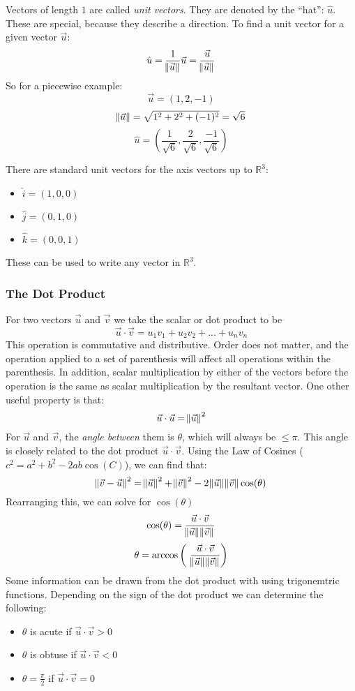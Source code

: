 \documentclass[12pt]{report}
\newcommand{\R}{\mathbb{R}}
\begin{document}
\begin{flushleft}
Vectors of length \(1\) are called \textit{unit vectors}. They are denoted by
the ``hat'': \(\hat{u}\). These are special, because they describe a direction.
To find a unit vector for a given vector \(\vec{u}\):
\[\hat{u} = \frac{1}{\norm{\vec{u}}}\vec{u} = \frac{\vec{u}}{\norm{\vec{u}}}\]
So for a piecewise example:
\[\vec{u} = (1, 2, -1)\]
\[\norm{\vec{u}} = \sqrt{1^2 + 2^2 + (-1)^2} = \sqrt{6}\]
\[\hat{u} = (\frac{1}{\sqrt{6}}, \frac{2}{\sqrt{6}}, \frac{-1}{\sqrt{6}})\]

\bigskip
There are standard unit vectors for the axis vectors up to \(\R^3\):
\begin{itemize}
    \item \(\hat{i} = (1, 0, 0)\)
    \item \(\hat{j} = (0, 1, 0)\)
    \item \(\hat{k} = (0, 0, 1)\)
\end{itemize}
These can be used to write any vector in \(\R^3\).

\subsubsection*{The Dot Product}
For two vectors \(\vec{u}\) and \(\vec{v}\) we take the scalar or dot product 
to be
\[\vec{u}\cdot\vec{v} = u_1v_1 + u_2v_2 + ... + u_nv_n\]
This operation is commutative and distributive. Order does not matter, and the
operation applied to a set of parenthesis will affect all operations within the
parenthesis. In addition, scalar multiplication by either of the vectors before 
the operation is the same as scalar multiplication by the resultant vector. 
One other useful property is that:
\[\vec{u}\cdot\vec{u} = \norm{\vec{u}}^2\]
For \(\vec{u}\) and \(\vec{v}\), the \textit{angle between} them is \(\theta\),
which will always be \(\leq\pi\). This angle is closely related to the dot 
product \(\vec{u}\cdot\vec{v}\). Using the Law of Cosines 
(\(c^2 = a^2 + b^2 - 2ab\cos(C)\)), we can find that:
\[\norm{\vec{v} - \vec{u}}^2 = \norm{\vec{u}}^2 + 
\norm{\vec{v}}^2 - 2\norm{\vec{u}}\norm{\vec{v}}\cos(\theta)\]
Rearranging this, we can solve for \(\cos(\theta)\)
\[\cos(\theta) = \frac{\vec{u}\cdot\vec{v}}{\norm{\vec{u}}\norm{\vec{v}}}\]
\[\theta = \arccos\left(\
\frac{\vec{u}\cdot\vec{v}}{\norm{\vec{u}}\norm{\vec{v}}}\right)\]
Some information can be drawn from the dot product with using trigonemtric
functions. Depending on the sign of the dot product we can determine the 
following:
\begin{itemize}
    \item \(\theta\) is acute if \(\vec{u}\cdot\vec{v} > 0\)
    \item \(\theta\) is obtuse if \(\vec{u}\cdot\vec{v} < 0\)
    \item \(\theta = \frac{\pi}{2}\) if \(\vec{u}\cdot\vec{v} = 0\)
\end{itemize}


\end{flushleft}
\end{document}
